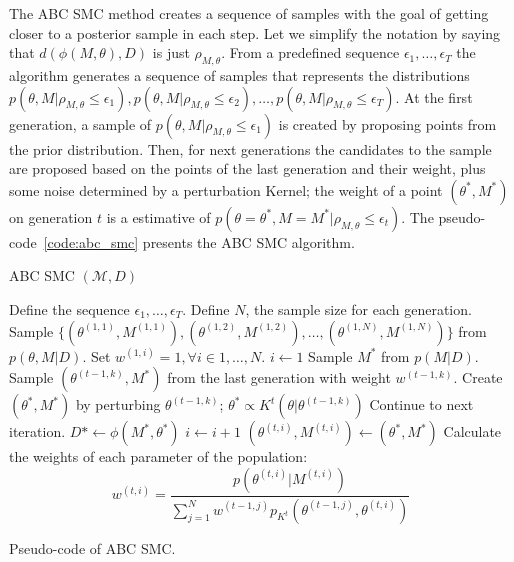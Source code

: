 The ABC SMC method creates a sequence of samples with the goal of 
getting closer to a posterior sample in each step. Let we simplify the
notation by saying that $d(\phi (M, \theta), D)$ is just 
$\rho_{M, \theta}$. From a predefined sequence $\epsilon_1, \ldots, 
\epsilon_T$ the algorithm generates a sequence of samples that 
represents the distributions 
$p (\theta, M| \rho_{M, \theta} \leq \epsilon_1), 
p (\theta, M| \rho_{M, \theta} \leq \epsilon_2), \ldots,
p (\theta, M| \rho_{M, \theta} \leq \epsilon_T)$. At the first 
generation, a sample of 
$p (\theta, M| \rho_{M, \theta} \leq \epsilon_1)$ is created by 
proposing points from the prior distribution. Then, for next generations
the candidates to the sample are proposed based on the points of the 
last generation and their weight, plus some noise determined by a 
perturbation Kernel; the weight of a point $(\theta^*, M^*)$ on 
generation $t$ is a estimative of  
$p (\theta = \theta^*, M = M^* | \rho_{M, \theta} \leq \epsilon_t)$. The 
pseudo-code~\ref{code:abc_smc} presents the ABC SMC algorithm.
\begin{algorithm}[h]
\textsc{ABC SMC} $(\mathcal{M}, D)$
\begin{algorithmic}[1]
    \State Define the sequence $\epsilon_1, \ldots, \epsilon_T$.
    \State Define $N$, the sample size for each generation. 
    \State Sample $\{(\theta^{(1, 1)}, M^{(1, 1)}), 
                     (\theta^{(1, 2)}, M^{(1, 2)}), \ldots, 
                     (\theta^{(1, N)}, M^{(1, N)})\}$ from 
                     $p (\theta, M| D)$.
    \State Set $w^{(1, i)} = 1, \forall i \in {1, \ldots, N}$.  
        \State $i \gets 1$
            \State Sample $M^*$ from $p (M | D)$.
            \State Sample $(\theta^{(t - 1, k)}, M^*)$ from the 
                last generation with weight $w^{(t - 1, k)}$.
            \State Create $(\theta^*, M^*)$ by perturbing 
                $\theta^{(t - 1, k)}$; 
                $\theta^* \propto K^t(\theta | \theta^{(t - 1, k)})$
                \State Continue to next iteration.
            \EndIf
            \State $D* \gets \phi (M^*, \theta^*)$
                \State $i \gets i + 1$
                \State $(\theta^{(t, i)}, M^{(t, i)}) \gets 
                    (\theta^*, M^*)$
            \EndIf
        \EndWhile
        \State Calculate the weights of each parameter of the 
            population:
            \begin{equation*}
                w^{(t, i)} = \frac{p (\theta^{(t, i)} | M^{(t, i)})}
                         {\sum_{j = 1}^N w^{(t-1, j)}p_{K^t}
                            (\theta^{(t-1, j)}, \theta^{(t, i)})}
            \end{equation*}
    \EndFor
    \Return
\end{algorithmic}
\vspace{1em}

\caption{Pseudo-code of ABC SMC.}
\label{code:abc_smc}
\end{algorithm}



